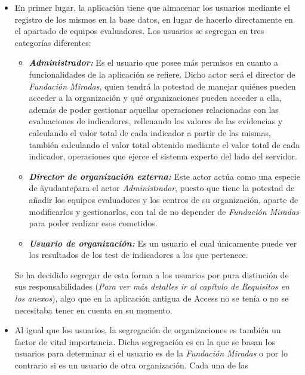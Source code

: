 \begin{itemize}
    \item En primer lugar, la aplicación tiene que almacenar los usuarios
    mediante el registro de los mismos en la base datos, en lugar de hacerlo
    directamente en el apartado de equipos evaluadores. Los usuarios se segregan
    en tres categorías diferentes:
    \begin{itemize}
        \item \textit{\textbf{Administrador:}} Es el usuario que posee más
        permisos en cuanto a funcionalidades de la aplicación se refiere. Dicho
        actor será el director de \textit{Fundación Miradas}, quien tendrá la
        potestad de manejar quiénes pueden acceder a la organización y qué
        organizaciones pueden acceder a ella, además de poder gestionar aquellas
        operaciones relacionadas con las evaluaciones de indicadores, rellenando
        los valores de las evidencias y calculando el valor total de cada
        indicador a partir de las mismas, también calculando el valor total
        obtenido mediante el valor total de cada indicador, operaciones que
        ejerce el sistema experto del lado del servidor.
        \item \textit{\textbf{Director de organización externa: }}Este actor
        actúa como una especie de \"ayudante\" para el actor
        \textit{Administrador}, puesto que tiene la potestad de añadir los
        equipos evaluadores y los centros de su organización, aparte de
        modificarlos y gestionarlos, con tal de no depender de \textit{Fundación
        Miradas} para poder realizar esos cometidos. 
        \item \textit{\textbf{Usuario de organización: }}Es un usuario el cual
        únicamente puede ver los resultados de los test de indicadores a los que
        pertenece.
    \end{itemize}
    Se ha decidido segregar de esta forma a los usuarios por pura distinción de
    sus responsabilidades (\textit{Para ver más detalles ir al capítulo de
    Requisitos en los anexos}), algo que en la aplicación antigua de Access no
    se tenía o no se necesitaba tener en cuenta en su momento.
    \item Al igual que los usuarios, la segregación de organizaciones es también
    un factor de vital importancia. Dicha segregación es en la que se basan los
    usuarios para determinar si el usuario es de la \textit{Fundación Miradas} o
    por lo contrario si es un usuario de otra organización. Cada una de las

\end{itemize}
